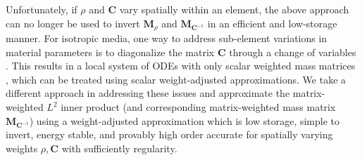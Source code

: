 \documentclass{siamart0216}
\newcommand{\pd}[2]{\frac{\partial#1}{\partial#2}}
\newcommand{\LRp}[1]{\left( #1 \right)}
\newcommand{\Div} {\ensuremath{\nabla\cdot}}
\begin{document}
Unfortunately, if $\rho$ and $\bm{C}$ vary spatially within an element, the above approach can no longer be used to invert $\bm{M}_\rho$ and $\bm{M}_{\bm{C}^{-1}}$ in an efficient and low-storage manner.  
For isotropic media, one way to address sub-element variations in material parameters is to diagonalize the matrix $\bm{C}$ through a change of variables \cite{etienne2010hp}.  This results in a local system of ODEs with only scalar weighted mass matrices \cite{mercerat2015nodal}, which can be treated using scalar weight-adjusted approximations.  We take a different approach in addressing these issues and approximate the matrix-weighted $L^2$ inner product (and corresponding matrix-weighted mass matrix $\bm{M}_{\bm{C}^{-1}}$) using a weight-adjusted approximation which is low storage, simple to invert, energy stable, and provably high order accurate for spatially varying weights $\rho, \bm{C}$ with sufficiently regularity.   

\end{document}
